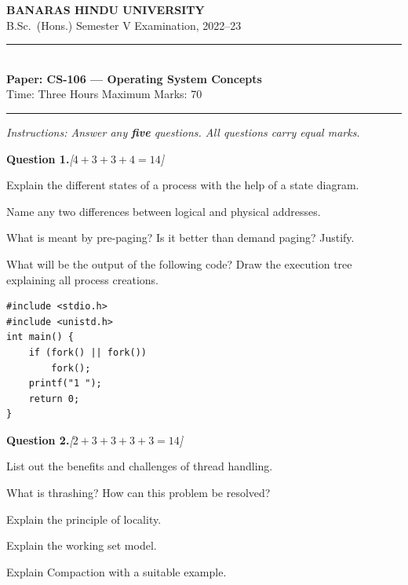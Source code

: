 \documentclass[11pt,a4paper]{article}
\newcommand{\pts}[1]{\hfill   \textit{[#1]}}
\begin{document}
\begin{center}
  {\large\bfseries BANARAS HINDU UNIVERSITY}\\[2pt]
  {\normalsize B.Sc.\ (Hons.) Semester V Examination, 2022--23}\\[6pt]
  \rule{0.8\linewidth}{0.5pt}\\[6pt]
  {\large\bfseries Paper: CS-106 --- Operating System Concepts}\\[4pt]
  {\normalsize Time: Three Hours \hfill Maximum Marks: 70}
\end{center}

\rule{\linewidth}{0.4pt}

\smallskip



\noindent   \textit{Instructions: Answer any   \textbf{five} questions. All questions carry equal marks.}

\bigskip




\noindent   \textbf{Question 1.}\pts{$4+3+3+4=14$}

\begin{parts}
  \item Explain the different states of a process with the help of a state diagram.
  \item Name any two differences between logical and physical addresses.
  \item What is meant by pre-paging? Is it better than demand paging? Justify.
  \item What will be the output of the following code? Draw the execution tree explaining all process creations.

\begin{lstlisting}
#include <stdio.h>
#include <unistd.h>
int main() {
    if (fork() || fork())
        fork();
    printf("1 ");
    return 0;
}
\end{lstlisting}
\end{parts}

\bigskip




\noindent   \textbf{Question 2.}\pts{$2+3+3+3+3=14$}

\begin{parts}
  \item List out the benefits and challenges of thread handling.
  \item What is thrashing? How can this problem be resolved?
  \item Explain the principle of locality.
  \item Explain the working set model.
  \item Explain Compaction with a suitable example.
\end{parts}
\end{document}
